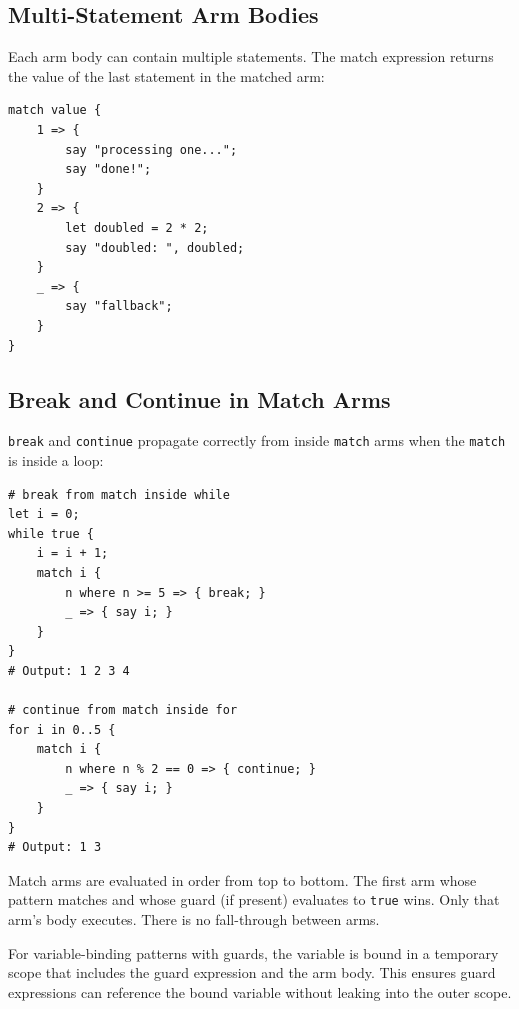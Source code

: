 \subsection{Multi-Statement Arm Bodies}

Each arm body can contain multiple statements. The match expression returns the value of the last statement in the matched arm:

\begin{tcolorbox}[colback=codebg, colframe=darkpurple, colbacktitle=darkpurple, title=\textbf{\textcolor{codegold}{Multi-Statement Arms}}, fonttitle=\bfseries, sharp corners]
\begin{lstlisting}
match value {
    1 => {
        say "processing one...";
        say "done!";
    }
    2 => {
        let doubled = 2 * 2;
        say "doubled: ", doubled;
    }
    _ => {
        say "fallback";
    }
}
\end{lstlisting}
\end{tcolorbox}

\subsection{Break and Continue in Match Arms}

\texttt{break} and \texttt{continue} propagate correctly from inside \texttt{match} arms when the \texttt{match} is inside a loop:

\begin{tcolorbox}[colback=codebg, colframe=darkpurple, colbacktitle=darkpurple, title=\textbf{\textcolor{codegold}{Match Inside Loops}}, fonttitle=\bfseries, sharp corners]
\begin{lstlisting}
# break from match inside while
let i = 0;
while true {
    i = i + 1;
    match i {
        n where n >= 5 => { break; }
        _ => { say i; }
    }
}
# Output: 1 2 3 4

# continue from match inside for
for i in 0..5 {
    match i {
        n where n % 2 == 0 => { continue; }
        _ => { say i; }
    }
}
# Output: 1 3
\end{lstlisting}
\end{tcolorbox}

\begin{tcolorbox}[colback=lightlavender, colframe=softvioletdark, title=\textbf{\textcolor{darkpurple}{Design Note: Match Evaluation}}, fonttitle=\bfseries, sharp corners]
  Match arms are evaluated in order from top to bottom. The first arm whose pattern matches and whose guard (if present) evaluates to \texttt{true} wins. Only that arm's body executes. There is no fall-through between arms.
  
For variable-binding patterns with guards, the variable is bound in a temporary scope that includes the guard expression and the arm body. This ensures guard expressions can reference the bound variable without leaking into the outer scope.
\end{tcolorbox}
